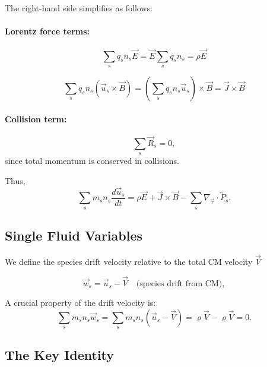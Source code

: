 The right-hand side simplifies as follows:

\paragraph{Lorentz force terms:}
\begin{equation*}
\sum_s q_s n_s \vec{E} = \vec{E} \sum_s q_s n_s = \rho \vec{E}
\end{equation*}

\begin{equation*}
\sum_s q_s n_s (\vec{u}_s \times \vec{B}) = \left(\sum_s q_s n_s \vec{u}_s\right) \times \vec{B} = \vec{J} \times \vec{B}
\end{equation*}

\paragraph{Collision term:}
\begin{equation*}
\sum_s \vec{R}_s = 0,
\end{equation*}
since total momentum is conserved in collisions.

Thus,
\begin{equation*}
\sum_s m_s n_s \frac{d\vec{u}_s}{dt} = \rho \vec{E} + \vec{J} \times \vec{B} - \sum_s \nabla_{\vec{r}} \cdot \overleftrightarrow{P}_s.
\label{eq:summed_momentum}
\end{equation*}

\subsection*{Single Fluid Variables}

We define the species drift velocity relative to the total CM velocity $\vec{V}$

\begin{equation*}
\vec{w}_s = \vec{u}_s - \vec{V} \quad \text{(species drift from CM)},
\end{equation*}

A crucial property of the drift velocity is:
\begin{equation}
\sum_s m_s n_s \vec{w}_s = \sum_s m_s n_s (\vec{u}_s - \vec{V}) = \varrho \vec{V} - \varrho \vec{V} = 0.
\label{eq:drift_sum_zero}
\end{equation}

\subsection*{The Key Identity}

